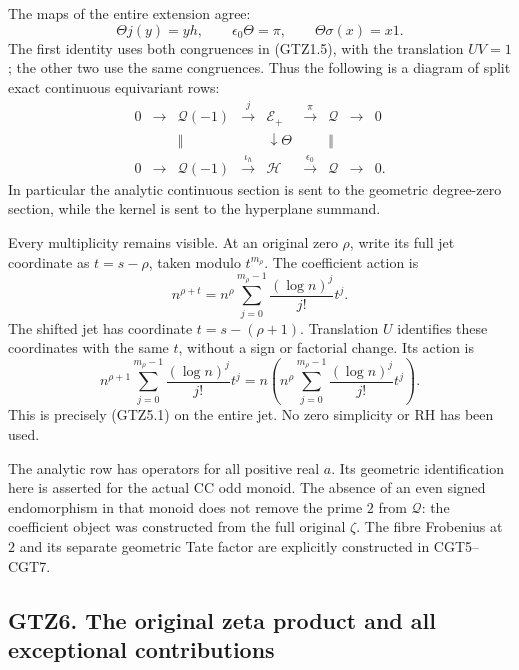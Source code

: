 The maps of the entire extension agree: \[
\Theta j(y)=yh,\qquad
\epsilon_0\Theta=\pi,\qquad
\Theta\sigma(x)=x1.
\tag{GTZ5.3}
\] The first identity uses both congruences in (GTZ1.5), with the
translation \(U V=1\); the other two use the same congruences. Thus the
following is a diagram of split exact continuous equivariant rows: \[
\begin{array}{ccccccccc}
0&\to&\mathcal Q(-1)&\xrightarrow{j}&\mathcal E_+
&\xrightarrow{\pi}&\mathcal Q&\to&0\\
&&\Vert&&\downarrow\Theta&&\Vert\\
0&\to&\mathcal Q(-1)&\xrightarrow{\iota_h}&\mathcal H
&\xrightarrow{\epsilon_0}&\mathcal Q&\to&0 .
\end{array}
\tag{GTZ5.4}
\] In particular the analytic continuous section is sent to the
geometric degree-zero section, while the kernel is sent to the
hyperplane summand.

Every multiplicity remains visible. At an original zero \(\rho\), write
its full jet coordinate as \(t=s-\rho\), taken modulo \(t^{m_\rho}\).
The coefficient action is \[
n^{\rho+t}
=n^\rho\sum_{j=0}^{m_\rho-1}\frac{(\log n)^j}{j!}t^j.
\tag{GTZ5.5}
\] The shifted jet has coordinate \(t=s-(\rho+1)\). Translation \(U\)
identifies these coordinates with the same \(t\), without a sign or
factorial change. Its action is \[
n^{\rho+1}\sum_{j=0}^{m_\rho-1}
\frac{(\log n)^j}{j!}t^j
=n\left(n^\rho\sum_{j=0}^{m_\rho-1}
\frac{(\log n)^j}{j!}t^j\right).
\tag{GTZ5.6}
\] This is precisely (GTZ5.1) on the entire jet. No zero simplicity or
RH has been used.

The analytic row has operators for all positive real \(a\). Its
geometric identification here is asserted for the actual CC odd monoid.
The absence of an even signed endomorphism in that monoid does not
remove the prime \(2\) from \(\mathcal Q\): the coefficient object was
constructed from the full original \(\zeta\). The fibre Frobenius at
\(2\) and its separate geometric Tate factor are explicitly constructed
in CGT5--CGT7.

\subsection{GTZ6. The original zeta product and all exceptional
contributions}\label{gtz6.-the-original-zeta-product-and-all-exceptional-contributions}

